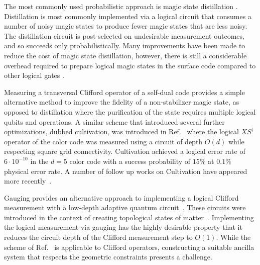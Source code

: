 \documentclass[aps,prx,twocolumn,secnumarabic,superscriptaddress,nofootinbib]{revtex4-2}
\begin{document}
The most commonly used probabilistic approach is magic state distillation \cite{bravyiUniversalQuantumComputation2005}. Distillation is most commonly implemented via a logical circuit that consumes a number of noisy magic states to produce fewer magic states that are less noisy. The distillation circuit is post-selected on undesirable measurement outcomes, and so succeeds only probabilistically. Many improvements have been made to reduce the cost of magic state distillation, however, there is still a considerable overhead required to prepare logical magic states in the surface code compared to other logical gates \cite{bravyiUniversalQuantumComputation2005,fowlerSurfaceCodesPractical2012,litinskiMagicStateDistillation2019}.

Measuring a transversal Clifford operator of a self-dual code \cite{Goto2016Min,chamberlandFaulttolerantMagicState2019,Chamberland2020,Gupta2024,Itogawa2025} provides a simple alternative method to improve the fidelity of a non-stabilizer magic state, as opposed to distillation where the purification of the state requires multiple logical qubits and operations. A similar scheme that introduced several further optimizations, dubbed cultivation, was introduced in Ref.~\cite{gidneyMagicStateCultivation2024} where the logical $XS^\dagger$ operator of the color code was measured using a circuit of depth $O(d)$ while respecting square grid connectivity. Cultivation achieved a logical error rate of $6\cdot 10^{-10}$ in the $d=5$ color code with a success probability of $15\%$ at $0.1\%$ physical error rate. A number of follow up works on Cultivation have appeared more recently~\cite{vaknin2026efficientmagicstatecultivation,chen2025efficientmagicstatecultivation,sahay2025foldtransversalsurfacecodecultivation,claes2025cultivatingtstatessurface}. 

Gauging provides an alternative approach to implementing a logical Clifford measurement with a low-depth adaptive quantum circuit~\cite{williamsonLowoverheadFaulttolerantQuantum2024,davydovaUniversalFaultTolerant}. 
These circuits were introduced in the context of creating topological states of matter~\cite{Williamson2020a,Tantivasadakarn2021,Tantivasadakarn2022}. 
Implementing the logical measurement via gauging has the highly desirable property that it reduces the circuit depth of the Clifford measurement step to $O(1)$.
While the scheme of Ref.~\cite{williamsonLowoverheadFaulttolerantQuantum2024} is applicable to Clifford operators, constructing a suitable ancilla system that respects the geometric constraints presents a challenge.
\end{document}
